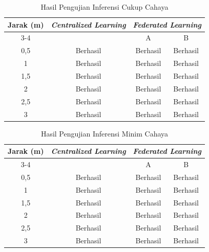\begin{table}[H]
  \centering
  \caption{Hasil Pengujian Inferensi Cukup Cahaya}
  \label{tab:inferensi-cukup-cahaya}
  \begin{tabular}{|c|c|c|c|}
    \hline
    Jarak (m) & \textit{Centralized Learning} & \multicolumn{2}{c|}{\textit{Federated Learning}} \\
    \cline{3-4}
    & & A & B \\
    \hline
    0,5 & Berhasil & Berhasil & Berhasil \\
    1 & Berhasil & Berhasil & Berhasil \\
    1,5 & Berhasil & Berhasil & Berhasil \\
    2 & Berhasil & Berhasil & Berhasil \\
    2,5 & Berhasil & Berhasil & Berhasil \\
    3 & Berhasil & Berhasil & Berhasil \\
    \hline
  \end{tabular}
\end{table}

\begin{table}[H]
  \centering
  \caption{Hasil Pengujian Inferensi Minim Cahaya}
  \label{tab:inferensi-minim-cahaya}
  \begin{tabular}{|c|c|c|c|}
    \hline
    Jarak (m) & \textit{Centralized Learning} & \multicolumn{2}{c|}{\textit{Federated Learning}} \\
    \cline{3-4}
    & & A & B \\
    \hline
    0,5 & Berhasil & Berhasil & Berhasil \\
    1 & Berhasil & Berhasil & Berhasil \\
    1,5 & Berhasil & Berhasil & Berhasil \\
    2 & Berhasil & Berhasil & Berhasil \\
    2,5 & Berhasil & Berhasil & Berhasil \\
    3 & Berhasil & Berhasil & Berhasil \\
    \hline
  \end{tabular}
\end{table}

